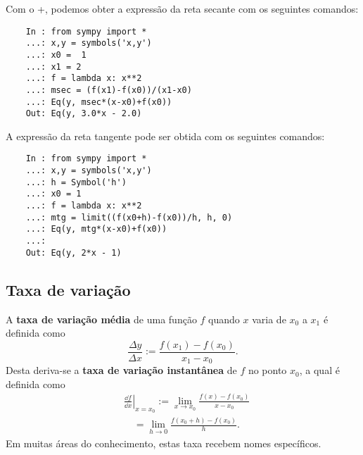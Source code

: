 \begin{ex}
  \ifispython
  Com o {\python}+{\sympy}, podemos obter a expressão da reta secante com os seguintes comandos:
  \begin{lstlisting}
    In : from sympy import *
    ...: x,y = symbols('x,y')
    ...: x0 =  1
    ...: x1 = 2
    ...: f = lambda x: x**2
    ...: msec = (f(x1)-f(x0))/(x1-x0)
    ...: Eq(y, msec*(x-x0)+f(x0))
    Out: Eq(y, 3.0*x - 2.0)
  \end{lstlisting}
  A expressão da reta tangente pode ser obtida com os seguintes comandos:
  \begin{lstlisting}
    In : from sympy import *
    ...: x,y = symbols('x,y')
    ...: h = Symbol('h')
    ...: x0 = 1
    ...: f = lambda x: x**2
    ...: mtg = limit((f(x0+h)-f(x0))/h, h, 0)
    ...: Eq(y, mtg*(x-x0)+f(x0))
    ...: 
    Out: Eq(y, 2*x - 1)
  \end{lstlisting}
  \fi
\end{ex}

\subsection{Taxa de variação}

A {\bf taxa de variação média} de uma função $f$ quando $x$ varia de $x_0$ a $x_1$ é definida como
\begin{equation}
  \frac{\Delta y}{\Delta x} := \frac{f(x_1)-f(x_0)}{x_1-x_0}. 
\end{equation}
Desta deriva-se a {\bf taxa de variação instantânea} de $f$ no ponto $x_0$, a qual é definida como
\begin{align}
  & \left.\frac{\dd f}{\dd x}\right|_{x=x_0} := \lim_{x\to x_0} \frac{f(x)-f(x_0)}{x-x_0}\\
  & \text{}\quad = \lim_{h\to 0} \frac{f(x_0+h)-f(x_0)}{h}.
\end{align}
Em muitas áreas do conhecimento, estas taxa recebem nomes específicos.

